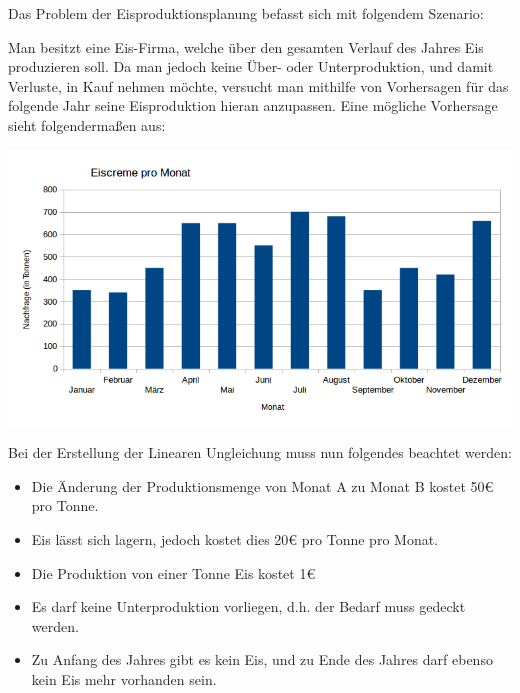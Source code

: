 Das Problem der Eisproduktionsplanung befasst sich mit folgendem Szenario:

Man besitzt eine Eis-Firma, welche über den gesamten Verlauf des Jahres Eis produzieren soll. Da man jedoch keine Über- oder Unterproduktion, und damit Verluste, in Kauf nehmen möchte, versucht man mithilfe von Vorhersagen für das folgende Jahr seine Eisproduktion hieran anzupassen. Eine mögliche Vorhersage sieht folgendermaßen aus:

\centering
\includegraphics[width=\textwidth]{Grafiken/Eiscreme.png}

\raggedright
Bei der Erstellung der Linearen Ungleichung muss nun folgendes beachtet werden:

\begin{itemize}
\item Die Änderung der Produktionsmenge von Monat A zu Monat B kostet 50€ pro Tonne.
\item Eis lässt sich lagern, jedoch kostet dies 20€ pro Tonne pro Monat.
\item Die Produktion von einer Tonne Eis kostet 1€
\item Es darf keine Unterproduktion vorliegen, d.h. der Bedarf muss gedeckt werden.
\item Zu Anfang des Jahres gibt es kein Eis, und zu Ende des Jahres darf ebenso kein Eis mehr vorhanden sein.
\end{itemize}

